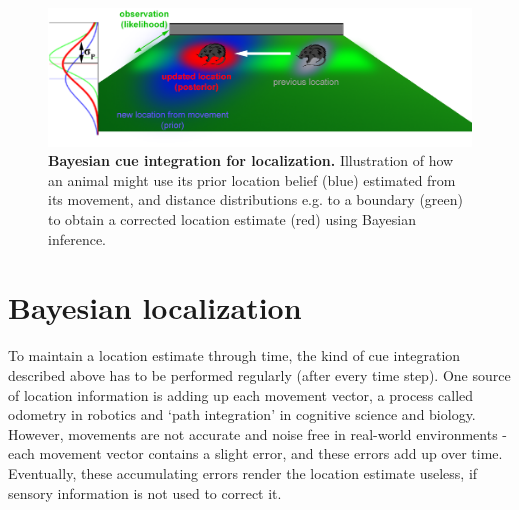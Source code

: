 

\begin{figure}[h]
	\centering
	\includegraphics[width=\textwidth]{img/bayesian_localization3}
	\caption[Bayesian cue integration for localization]{\textbf{Bayesian cue integration for localization.} Illustration of how an animal might use its prior location belief (blue) estimated from its movement, and distance distributions e.g. to a boundary (green) to obtain a corrected location estimate (red) using Bayesian inference.} 
	\label{fig:bayescue} 
\end{figure}

%
\section{Bayesian localization}

To maintain a location estimate through time, the kind of cue integration described above has to be performed regularly (after every time step). One source of location information is adding up each movement vector, a process called odometry in robotics and `path integration' in cognitive science and biology. However, movements are not accurate and noise free in real-world environments - each movement vector contains a slight error, and these errors add up over time. Eventually, these accumulating errors render the location estimate useless, if sensory information is not used to correct it. 

